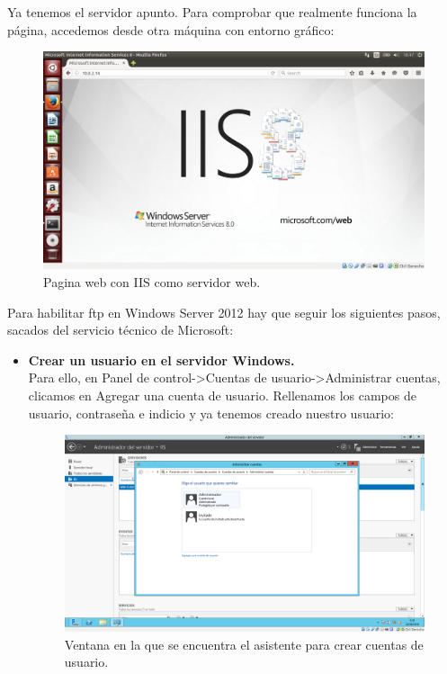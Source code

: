 \begin{itemize}
	Ya tenemos el servidor apunto. Para comprobar que realmente funciona la página, accedemos desde otra máquina con entorno gráfico:\\
	
	\begin{figure}[H]
		\centering
		\includegraphics[width=0.7\linewidth]{WindowsWebPage}
		\caption[Pagina de web]{Pagina web con IIS como servidor web.}
		\label{fig:WindowsWebPage}
	\end{figure}
		
	Para habilitar ftp en Windows Server 2012 hay que seguir los siguientes pasos, sacados del servicio técnico de Microsoft\cite{tutorialFTP}:\\
	
	\begin{itemize}
		\item \textbf{Crear un usuario en el servidor Windows.}\\
		
		Para ello, en Panel de control->Cuentas de usuario->Administrar cuentas, clicamos en Agregar una cuenta de usuario. Rellenamos los campos de usuario, contraseña e indicio y ya tenemos creado nuestro usuario:\\
		
		\begin{figure}[H]
			\centering
			\includegraphics[width=0.7\linewidth]{AnadirCuentaUsuarioWS}
			\caption[Añadir cuenta]{Ventana en la que se encuentra el asistente para crear cuentas de usuario.}
			\label{fig:AñadirCuentaUsuarioWS}
		\end{figure}
		

\end{itemize}
\end{itemize}
